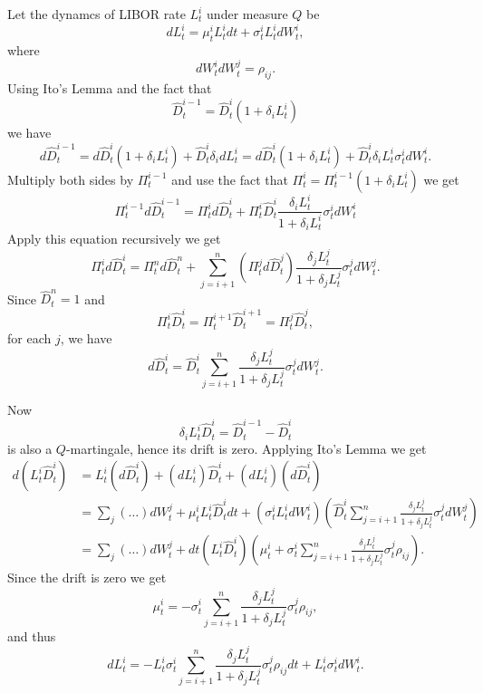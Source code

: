 Let the dynamcs of LIBOR rate $L_t^i$ under measure $Q$ be
\begin{equation}
  dL_t^i = \mu_t^i L_t^i dt + \sigma_t^i L_t^i dW_t^i,
\end{equation}
where 
\begin{equation}
  dW_t^i dW_t^j = \rho_{ij}.
\end{equation}
Using Ito's Lemma and the fact that
\[
  \hat{D}_t^{i-1} = \hat{D}_t^{i} (1+\delta_i L_t^i)
\]
we have
\[
  d\hat{D}_t^{i-1} 
    = d\hat{D}_t^{i} (1+\delta_i L_t^i) + \hat{D}_t^{i} \delta_i dL_t^i
    = d\hat{D}_t^{i} (1+\delta_i L_t^i) 
      + \hat{D}_t^{i} \delta_i L_t^i \sigma_t^i dW_t^i.
\]
Multiply both sides by $\Pi_t^{i-1}$ and use the fact that
$\Pi_t^i=\Pi_t^{i-1} (1+\delta_i L_t^i)$ we get
\[
  \Pi_t^{i-1} d\hat{D}_t^{i-1} 
    = \Pi_t^{i} d\hat{D}_t^{i} 
      + \Pi_t^{i} \hat{D}_t^{i} \frac{\delta_i L_t^i}{1+\delta_i L_t^i} 
        \sigma_t^i dW_t^i
\]
Apply this equation recursively we get
\[
  \Pi_t^{i} d\hat{D}_t^{i} 
    = \Pi_t^n d\hat{D}_t^{n}
     +\sum_{j=i+1}^n (\Pi_t^j d\hat{D}_t^{j}) 
       \frac{\delta_j L_t^j}{1+\delta_j L_t^j} \sigma_t^j dW_t^j.
\]
Since $\hat{D}_t^{n}=1$ and
\[
  \Pi_t^i \hat{D}_t^{i}
    = \Pi_t^{i+1} \hat{D}_t^{i+1}
    = \Pi_t^j \hat{D}_t^{j},
\]
for each $j$, 
we have 
\begin{equation}
  d\hat{D}_t^{i} 
    = \hat{D}_t^{i} \sum_{j=i+1}^n
       \frac{\delta_j L_t^j}{1+\delta_j L_t^j} \sigma_t^j dW_t^j.
\end{equation}

Now
\[
  \delta_i L_t^i \hat{D}_t^{i} =  \hat{D}_t^{i-1} - \hat{D}_t^{i}  
\]
is also a $Q$-martingale, hence its drift is zero. Applying Ito's Lemma we
get
\begin{align*}
  d( L_t^i \hat{D}_t^{i} )
    &= L_t^i (d\hat{D}_t^{i}) + (dL_t^i) \hat{D}_t^{i} 
      +  (dL_t^i) (d\hat{D}_t^{i})   \\
    &= \sum_j (\dots) dW_t^j + \mu_t^i L_t^i \hat{D}_t^{i} dt
      + (\sigma_t^i L_t^i dW_t^i) 
        \left( \hat{D}_t^{i} \sum_{j=i+1}^n
          \frac{\delta_j L_t^j}{1+\delta_j L_t^j} \sigma_t^j dW_t^j \right) \\
    &= \sum_j (\dots) dW_t^j 
      + dt (L_t^i \hat{D}_t^{i}) 
       \left( \mu_t^i 
          + \sigma_t^i \sum_{j=i+1}^n \frac{\delta_j L_t^j}{1+\delta_j L_t^j} \sigma_t^j \rho_{ij}
       \right).
\end{align*}
Since the drift is zero we get
\begin{equation}
  \mu_t^i = - \sigma_t^i \sum_{j=i+1}^n \frac{\delta_j L_t^j}{1+\delta_j L_t^j} \sigma_t^j \rho_{ij},
\end{equation}
and thus
\begin{equation}
  dL_t^i 
    = - L_t^i \sigma_t^i 
      \sum_{j=i+1}^n \frac{\delta_j L_t^j}{1+\delta_j L_t^j} \sigma_t^j \rho_{ij} dt
      + L_t^i \sigma_t^i dW_t^i.
\end{equation}


